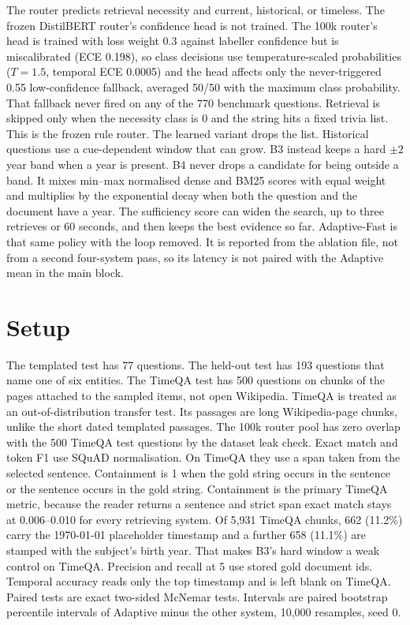 \documentclass[sigconf,anonymous,review]{acmart}
\begin{document}
The router predicts retrieval necessity and current, historical, or timeless.
The frozen DistilBERT router's confidence head is not trained.
The 100k router's head is trained with loss weight 0.3 against labeller confidence but is miscalibrated (ECE 0.198), so class decisions use temperature-scaled probabilities ($T{=}1.5$, temporal ECE 0.0005) and the head affects only the never-triggered 0.55 low-confidence fallback, averaged 50/50 with the maximum class probability.
That fallback never fired on any of the 770 benchmark questions.
Retrieval is skipped only when the necessity class is 0 and the string hits a fixed trivia list.
This is the frozen rule router.
The learned variant drops the list.
Historical questions use a cue-dependent window that can grow.
B3 instead keeps a hard $\pm 2$ year band when a year is present.
B4 never drops a candidate for being outside a band.
It mixes min--max normalised dense and BM25 scores with equal weight and multiplies by the exponential decay when both the question and the document have a year.
The sufficiency score can widen the search, up to three retrieves or 60 seconds, and then keeps the best evidence so far.
Adaptive-Fast is that same policy with the loop removed.
It is reported from the ablation file, not from a second four-system pass, so its latency is not paired with the Adaptive mean in the main block.

\section{Setup}

The templated test has 77 questions.
The held-out test has 193 questions that name one of six entities.
The TimeQA test has 500 questions on chunks of the pages attached to the sampled items, not open Wikipedia.
TimeQA is treated as an out-of-distribution transfer test.
Its passages are long Wikipedia-page chunks, unlike the short dated templated passages.
The 100k router pool has zero overlap with the 500 TimeQA test questions by the dataset leak check.
Exact match and token F1 use SQuAD normalisation.
On TimeQA they use a span taken from the selected sentence.
Containment is 1 when the gold string occurs in the sentence or the sentence occurs in the gold string.
Containment is the primary TimeQA metric, because the reader returns a sentence and strict span exact match stays at 0.006--0.010 for every retrieving system.
Of 5{,}931 TimeQA chunks, 662 (11.2\%) carry the 1970-01-01 placeholder timestamp and a further 658 (11.1\%) are stamped with the subject's birth year.
That makes B3's hard window a weak control on TimeQA.
Precision and recall at 5 use stored gold document ids.
Temporal accuracy reads only the top timestamp and is left blank on TimeQA.
Paired tests are exact two-sided McNemar tests.
Intervals are paired bootstrap percentile intervals of Adaptive minus the other system, 10{,}000 resamples, seed 0.
\end{document}
